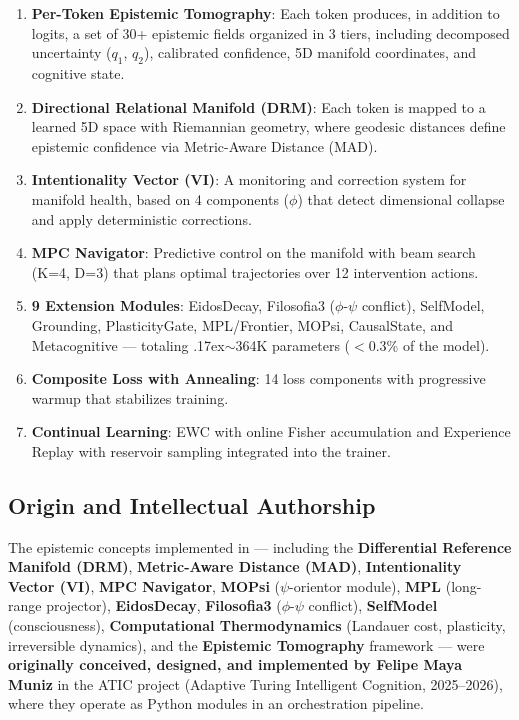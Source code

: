 \begin{enumerate}
    \item \textbf{Per-Token Epistemic Tomography}: Each token produces,
    in addition to logits, a set of 30+ epistemic fields organized in
    3 tiers, including decomposed uncertainty ($q_1$, $q_2$), calibrated
    confidence, 5D manifold coordinates, and cognitive state.

    \item \textbf{Directional Relational Manifold (DRM)}: Each token
    is mapped to a learned 5D space with Riemannian geometry, where
    geodesic distances define epistemic confidence via Metric-Aware
    Distance (MAD).

    \item \textbf{Intentionality Vector (VI)}: A monitoring and
    correction system for manifold health, based on 4 components
    ($\phi$) that detect dimensional collapse and apply deterministic
    corrections.

    \item \textbf{MPC Navigator}: Predictive control on the manifold
    with beam search (K=4, D=3) that plans optimal trajectories over
    12 intervention actions.

    \item \textbf{9 Extension Modules}: EidosDecay, Filosofia3
    ($\phi$-$\psi$ conflict), SelfModel, Grounding, PlasticityGate,
    MPL/Frontier, MOPsi, CausalState, and Metacognitive --- totaling
    {\raise.17ex\hbox{$\scriptstyle\sim$}}364K parameters ($<$0.3\% of the model).

    \item \textbf{Composite Loss with Annealing}: 14 loss components
    with progressive warmup that stabilizes training.

    \item \textbf{Continual Learning}: EWC with online Fisher
    accumulation and Experience Replay with reservoir sampling
    integrated into the trainer.
\end{enumerate}

\subsection{Origin and Intellectual Authorship}

The epistemic concepts implemented in \aletheion{} --- including the
\textbf{Differential Reference Manifold (DRM)}, \textbf{Metric-Aware Distance (MAD)},
\textbf{Intentionality Vector (VI)}, \textbf{MPC Navigator},
\textbf{MOPsi} ($\psi$-orientor module), \textbf{MPL} (long-range projector),
\textbf{EidosDecay}, \textbf{Filosofia3} ($\phi$-$\psi$ conflict),
\textbf{SelfModel} (consciousness), \textbf{Computational Thermodynamics}
(Landauer cost, plasticity, irreversible dynamics), and the
\textbf{Epistemic Tomography} framework --- were \textbf{originally conceived,
designed, and implemented by Felipe Maya Muniz} in the ATIC project
(Adaptive Turing Intelligent Cognition, 2025--2026), where they operate
as Python modules in an orchestration pipeline.

